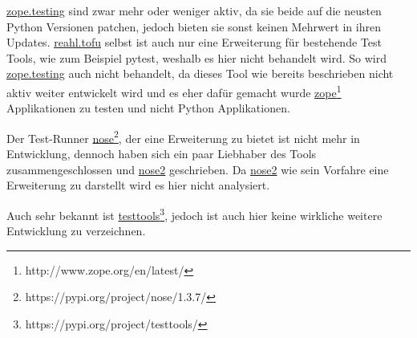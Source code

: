 \href{https://pypi.org/project/zope.testing/}{zope.testing} sind zwar mehr oder weniger aktiv, da sie
beide auf die neusten Python Versionen patchen, jedoch bieten sie sonst keinen Mehrwert in ihren Updates.
\href{https://www.reahl.org/docs/4.0/devtools/tofu.d.html}{reahl.tofu} selbst ist
auch nur eine Erweiterung für bestehende Test Tools, wie zum Beispiel pytest, weshalb es hier nicht behandelt wird. So wird
\href{https://pypi.org/project/zope.testing/}{zope.testing} auch nicht behandelt, da dieses Tool
wie bereits beschrieben nicht aktiv weiter entwickelt wird und es eher dafür gemacht wurde \href{http://www.zope.org/en/latest/}{zope}\footnote{http://www.zope.org/en/latest/}
Applikationen zu testen und nicht Python Applikationen.

Der Test-Runner \href{https://pypi.org/project/nose/1.3.7/}{nose}\footnote{https://pypi.org/project/nose/1.3.7/}, der eine Erweiterung
zu  bietet ist nicht mehr in Entwicklung, dennoch haben sich ein paar Liebhaber des Tools zusammengeschlossen
und \href{https://pypi.org/project/nose2/}{nose2} geschrieben.
Da \href{https://pypi.org/project/nose2/}{nose2} wie sein Vorfahre eine Erweiterung zu 
darstellt wird es hier nicht analysiert.

Auch sehr bekannt ist \href{https://pypi.org/project/testtools/}{testtools}\footnote{https://pypi.org/project/testtools/}, jedoch ist auch
hier keine wirkliche weitere Entwicklung zu verzeichnen.

